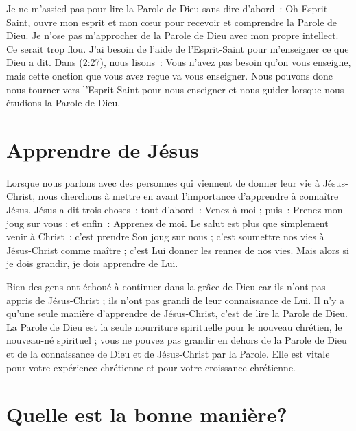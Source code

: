 Je ne m'assied pas pour lire la Parole de Dieu sans dire d'abord~:
 \og Oh Esprit-Saint, ouvre mon esprit et mon cœur pour recevoir
 et comprendre la Parole de Dieu. \fg{}
 Je n'ose pas m'approcher de la Parole de Dieu avec mon propre intellect.
 Ce serait trop flou. J'ai besoin de l'aide de l'Esprit-Saint
 pour m'enseigner ce que Dieu a dit.
 Dans (2:27), nous lisons~:
 \og Vous n'avez pas besoin qu'on vous enseigne, mais cette onction
 que vous avez reçue va vous enseigner. \fg{}
 Nous pouvons donc nous tourner vers l'Esprit-Saint
 pour nous enseigner et nous guider lorsque nous étudions
 la Parole de Dieu.


\section*{Apprendre de Jésus}

Lorsque nous parlons avec des personnes qui viennent de donner leur vie
 à Jésus-Christ, nous cherchons à mettre en avant l'importance d'apprendre
 à connaître Jésus. Jésus a dit trois choses~: tout d'abord~:
 \og Venez à moi \fg{} ; puis~: \og Prenez mon joug sur vous \fg{} ;
 et enfin~: \og Apprenez de moi. \fg{}
 Le salut est plus que simplement venir à Christ~: c'est prendre Son joug
 sur nous ; c'est soumettre nos vies à Jésus-Christ comme maître ;
 c'est Lui donner les rennes de nos vies.
 Mais alors si je dois grandir, je dois apprendre de Lui.

Bien des gens ont échoué à continuer dans la grâce de Dieu
 car ils n'ont pas appris de Jésus-Christ ; ils n'ont pas grandi
 de leur connaissance de Lui.
 Il n'y a qu'une seule manière d'apprendre de Jésus-Christ,
 c'est de lire la Parole de Dieu.
 La Parole de Dieu est la seule nourriture spirituelle pour le nouveau
 chrétien, le nouveau-né spirituel ; vous ne pouvez pas grandir en dehors
 de la Parole de Dieu et de la connaissance de Dieu et de Jésus-Christ
 par la Parole.
 Elle est vitale pour votre expérience chrétienne et pour votre croissance
 chrétienne.


\section*{Quelle est la bonne manière?}

